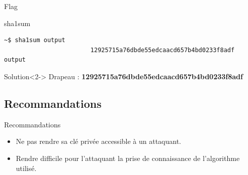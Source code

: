 \documentclass[10pt,sans,usenames,dvipsnames,french,compress]{beamer}
\begin{document}
\begin{frame}[fragile]{Flag}
  \begin{block}{sha1sum}
    \vspace{-3mm}
    \begin{lstlisting}[style=Term]
                        ~$ sha1sum output
                        12925715a76dbde55edcaacd657b4bd0233f8adf  output
    \end{lstlisting}
    \vspace{-2mm}
  \end{block}
  \begin{exampleblock}{Solution}<2->
		Drapeau : \textbf{12925715a76dbde55edcaacd657b4bd0233f8adf}
	\end{exampleblock}

\end{frame}

\subsection{Recommandations}
\begin{frame}{Recommandations}
	\begin{itemize}
		\item Ne pas rendre sa clé privée accessible à un attaquant.
    \item<2-> Rendre difficile pour l'attaquant la prise de connaissance de l'algorithme utilisé.
	\end{itemize}
\end{frame}
\end{document}

